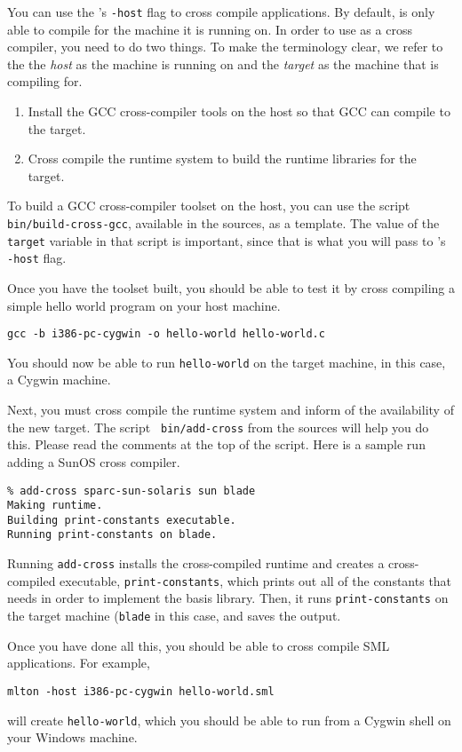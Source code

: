 
You can use the {\mlton}'s {\tt -host} flag to cross compile
applications.  By default, {\mlton} is only able to compile for the
machine it is running on.  In order to use {\mlton} as a cross
compiler, you need to do two things.  To make the terminology clear,
we refer to the the {\em host} as the machine {\mlton} is running on
and the {\em target} as the machine that {\mlton} is compiling for.

\begin{enumerate}

\item Install the GCC cross-compiler tools on the host so that GCC can
compile to the target.

\item Cross compile the {\mlton} runtime system to build the runtime
libraries for the target.

\end{enumerate}

To build a GCC cross-compiler toolset on the host, you can use the
script {\tt bin/build-cross-gcc}, available in the {\mlton} sources,
as a template.  The value of the {\tt target} variable in that script
is important, since that is what you will pass to {\mlton}'s {\tt
-host} flag.

Once you have the toolset built, you should be able to test it by
cross compiling a simple hello world program on your host machine.
\begin{verbatim}
gcc -b i386-pc-cygwin -o hello-world hello-world.c
\end{verbatim}
You should now be able to run {\tt hello-world} on the target machine,
in this case, a Cygwin machine.

Next, you must cross compile the {\mlton} runtime system and inform
{\mlton} of the availability of the new target.  The script {\tt
bin/add-cross} from the {\mlton} sources will help you do this.
Please read the comments at the top of the script.  Here is a sample
run adding a SunOS cross compiler.
\begin{verbatim}
% add-cross sparc-sun-solaris sun blade
Making runtime.
Building print-constants executable.
Running print-constants on blade.
\end{verbatim}
Running {\tt add-cross} installs the cross-compiled runtime and
creates a cross-compiled executable, {\tt print-constants}, which
prints out all of the constants that {\mlton} needs in order to
implement the basis library.  Then, it runs {\tt print-constants} on
the target machine ({\tt blade} in this case, and saves the output.

Once you have done all this, you should be able to cross compile SML
applications.  For example,
\begin{verbatim}
mlton -host i386-pc-cygwin hello-world.sml
\end{verbatim}
will create {\tt hello-world}, which you should be able to run from a
Cygwin shell on your Windows machine.
